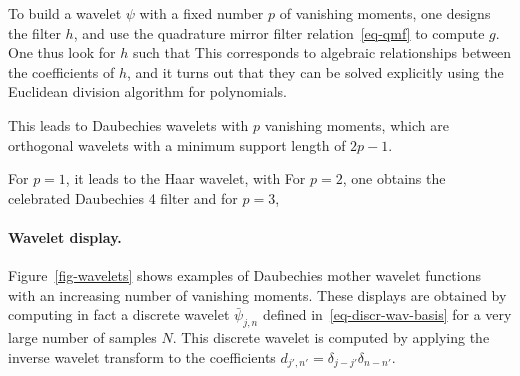 To build a wavelet $\psi$ with a fixed number $p$ of vanishing moments, one designs the filter $h$, and use the quadrature mirror filter relation~\eqref{eq-qmf} to compute $g$. One thus look for $h$ such that 
This corresponds to algebraic relationships between the coefficients of $h$, and it turns out that they can be solved explicitly using the Euclidean division algorithm for polynomials.  

This leads to Daubechies wavelets with $p$ vanishing moments, which are orthogonal wavelets with a minimum support length of $2p-1$.

For $p=1$, it leads to the Haar wavelet, with 
For $p=2$, one obtains the celebrated Daubechies 4 filter 
and for $p=3$,

\paragraph{Wavelet display.}

Figure~\ref{fig-wavelets} shows examples of Daubechies mother wavelet functions with an increasing number of vanishing moments. These displays are obtained by computing in fact a discrete wavelet $\bar \psi_{j,n}$ defined in~\eqref{eq-discr-wav-basis} for a very large number of samples $N$. This discrete wavelet is computed by applying the inverse wavelet transform to the coefficients
$d_{j',n'} = \delta_{j-j'} \delta_{n-n'}$.



